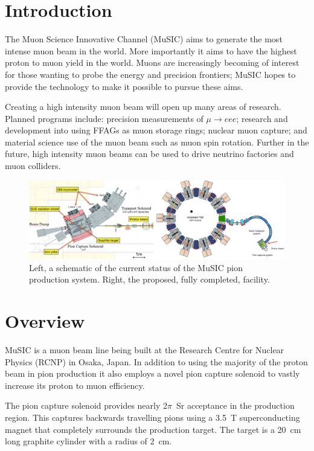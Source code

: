 \documentclass[a4paper]{jpconf}
\begin{document}
\section{Introduction}
The Muon Science Innovative Channel (MuSIC) aims to generate the most intense muon beam in the world. More importantly it aims to have the highest proton to muon yield in the world. Muons are increasingly becoming of interest for those wanting to probe the energy and precision frontiers; MuSIC hopes to provide the technology to make it possible to pursue  these aims.

Creating a high intensity muon beam will open up many areas of research. Planned programs include: precision measurements of $\mu \rightarrow eee$; research and development into using FFAGs as muon storage rings; nuclear muon capture; and material science use of the muon beam such as muon spin rotation. Further in the future, high intensity muon beams can be used to drive neutrino factories and muon colliders. 

\begin{figure}[htbp]
    \centering
        \includegraphics[width=16cm]{images/MuSIC_current_schematic2.png}
    \caption{Left, a schematic of the current status of the MuSIC pion production system. Right, the proposed, fully completed, facility.}
    \label{fig:MuSIC_schematic}
\end{figure}
\section{Overview}
MuSIC is a muon beam line being built at the Research Centre for Nuclear Physics (RCNP) in Osaka, Japan. In addition to using the majority of the proton beam in pion production it also employs a novel pion capture solenoid to vastly increase its proton to muon efficiency. 

The pion capture solenoid provides nearly 2$\pi$~Sr acceptance in the production region. This captures backwards travelling pions using a 3.5~T superconducting magnet that completely surrounds the production target. The target is a 20~cm long graphite cylinder with a radius of 2~cm.
\end{document}

